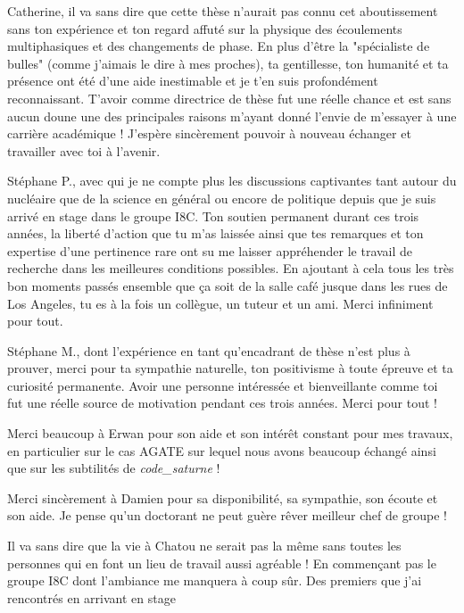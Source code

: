 \npar
Catherine, il va sans dire que cette thèse n'aurait pas connu cet aboutissement sans ton expérience et ton regard affuté sur la physique des écoulements multiphasiques et des changements de phase. En plus d'être la "spécialiste de bulles" (comme j'aimais le dire à mes proches), ta gentillesse, ton humanité et ta présence ont été d'une aide inestimable et je t'en suis profondément reconnaissant. T'avoir comme directrice de thèse fut une réelle chance et est sans aucun doune une des principales raisons m'ayant donné l'envie de m'essayer à une carrière académique ! J'espère sincèrement pouvoir à nouveau échanger et travailler avec toi à l'avenir.

\npar

Stéphane P., avec qui je ne compte plus les discussions captivantes tant autour du nucléaire que de la science en général ou encore de politique depuis que je suis arrivé en stage dans le groupe I8C.  Ton soutien permanent durant ces trois années, la liberté d'action que tu m'as laissée ainsi que tes remarques et ton expertise d'une pertinence rare ont su me laisser appréhender le travail de recherche dans les meilleures conditions possibles. En ajoutant à cela tous les très bon moments passés ensemble que ça soit de la salle café jusque dans les rues de Los Angeles, tu es à la fois un collègue, un tuteur et un ami. Merci infiniment pour tout.

\npar

Stéphane M., dont l'expérience en tant qu'encadrant de thèse n'est plus à prouver, merci pour ta sympathie naturelle, ton positivisme à toute épreuve et ta curiosité permanente. Avoir une personne intéressée et bienveillante comme toi fut une réelle source de motivation pendant ces trois années. Merci pour tout !

\npar

Merci beaucoup à Erwan pour son aide et son intérêt constant pour mes travaux, en particulier sur le cas AGATE sur lequel nous avons beaucoup échangé ainsi que sur les subtilités de \textit{code\_saturne} !

Merci sincèrement à Damien pour sa disponibilité, sa sympathie, son écoute et son aide. Je pense qu'un doctorant ne peut guère rêver meilleur chef de groupe !


Il va sans dire que la vie à Chatou ne serait pas la même sans toutes les personnes qui en font un lieu de travail aussi agréable ! En commençant pas le groupe I8C dont l'ambiance me manquera à coup sûr. Des premiers que j'ai rencontrés en arrivant en stage 

